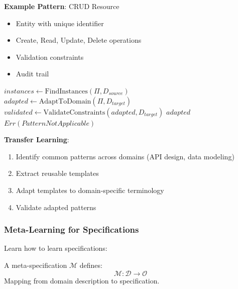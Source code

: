\textbf{Example Pattern}: CRUD Resource
\begin{itemize}
    \item Entity with unique identifier
    \item Create, Read, Update, Delete operations
    \item Validation constraints
    \item Audit trail
\end{itemize}

\begin{algorithm}
\caption{Pattern Transfer}
\begin{algorithmic}[1]
    \State $instances \gets \text{FindInstances}(\Pi, D_{source})$ 
    \State $adapted \gets \text{AdaptToDomain}(\Pi, D_{target})$ 
    \State $validated \gets \text{ValidateConstraints}(adapted, D_{target})$
        \State \Return $adapted$
    \Else
        \State \Return $Err(PatternNotApplicable)$
    \EndIf
\EndProcedure
\end{algorithmic}
\end{algorithm}

\textbf{Transfer Learning}:
\begin{enumerate}
    \item Identify common patterns across domains (API design, data modeling)
    \item Extract reusable templates
    \item Adapt templates to domain-specific terminology
    \item Validate adapted patterns
\end{enumerate}

\subsubsection{Meta-Learning for Specifications}

Learn how to learn specifications:

\begin{definition}
    A meta-specification $\mathcal{M}$ defines:
    \begin{equation}
        \mathcal{M}: \mathcal{D} \rightarrow \mathcal{O}
    \end{equation}
    Mapping from domain description to specification.
\end{definition}

